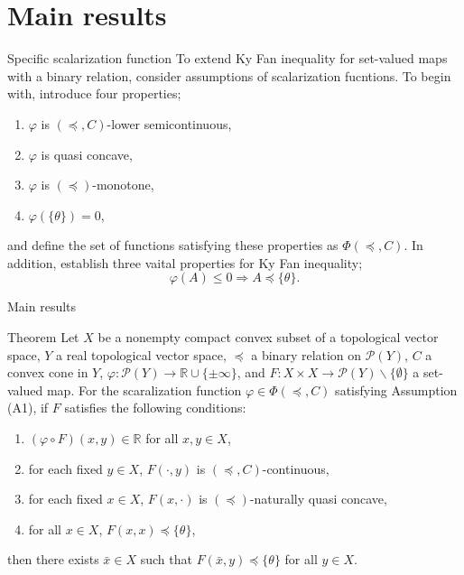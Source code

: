 \documentclass[aspectratio=169, dvipdfmx, 11pt]{beamer}
\newcommand{\RealNumberSet}{\mathbb{R}}
\begin{document}
\section{Main results}

\begin{frame}{Specific scalarization function}
  To extend Ky Fan inequality for set-valued maps with a binary relation, consider assumptions of scalarization fucntions. To begin with, introduce four properties;
  \begin{enumerate}
    \item $\varphi$ is $(\preccurlyeq, C)$-lower semicontinuous,
    \item $\varphi$ is quasi concave,
    \item $\varphi$ is $(\preccurlyeq)$-monotone,
    \item $\varphi(\{\theta\}) = 0$,
  \end{enumerate}
  and define the set of functions satisfying these properties as $\Phi(\preccurlyeq, C)$. In addition, establish three vaital properties for Ky Fan inequality;
  \begin{equation}
    \varphi (A) \leq 0 \Rightarrow A \preccurlyeq \{\theta\}. \tag*{(A1)}
  \end{equation}
\end{frame}

\begin{frame}{Main results}
  \begin{block}{Theorem}
    Let $X$ be a nonempty compact convex subset of a topological vector space,
    $Y$ a real topological vector space, $\preccurlyeq$ a binary relation on $\mathcal{P}(Y)$,
    $C$ a convex cone in $Y$, $\varphi\colon \mathcal{P}(Y) \to \RealNumberSet \cup \{\pm \infty\}$,
    and $F\colon X \times X \to \mathcal{P}(Y) \backslash \{\emptyset\}$ a set-valued map.
    For the scaralization function $\varphi \in \Phi(\preccurlyeq, C)$ satisfying Assumption (A1),
    if $F$ satisfies the following conditions:
    \begin{enumerate}
      \item $(\varphi \circ F)(x,y) \in \RealNumberSet$ for all $x,y \in X$,
      \item for each fixed $y \in X$, $F(\cdot,y)$ is $(\preccurlyeq, C)$-continuous,
      \item for each fixed $x \in X$, $F(x,\cdot)$ is $(\preccurlyeq)$-naturally quasi concave,
      \item for all $x \in X$, $F(x,x) \preccurlyeq \{\theta\}$,
    \end{enumerate}
    then there exists $\bar{x} \in X$ such that $ F(\bar{x},y) \preccurlyeq \{\theta\} $ for all $y \in X$.
  \end{block}
\end{frame}
\end{document}
